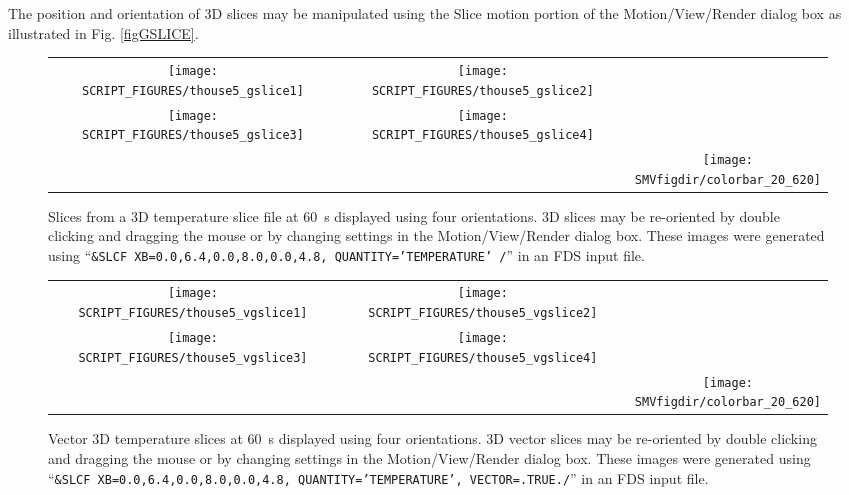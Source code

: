 \documentclass[11pt,twoside]{book}
\newcommand{\figheightAbar}{2.2in}
\begin{document}
The position and orientation of 3D slices may be manipulated using the Slice motion
portion of the Motion/View/Render dialog box as illustrated
in Fig. \ref{figGSLICE}.

\begin{figure}[bph]
\begin{center}
\begin{tabular}{ccc}
\texttt{[image: SCRIPT\_FIGURES/thouse5\_gslice1]}&
\texttt{[image: SCRIPT\_FIGURES/thouse5\_gslice2]}\\
\texttt{[image: SCRIPT\_FIGURES/thouse5\_gslice3]}&
\texttt{[image: SCRIPT\_FIGURES/thouse5\_gslice4]}&\\
&&\raisebox{0.0ex}[0pt]{\texttt{[image: \\SMVfigdir/colorbar\_20\_620]}}\\
\end{tabular}
\caption [General oriented temperature slices.]
{
Slices from a 3D temperature slice file at 60~s displayed using four orientations.
3D slices may be re-oriented by double clicking and dragging the mouse
or by changing settings in the Motion/View/Render dialog box.
These images were generated using
``{\tt \&SLCF XB=0.0,6.4,0.0,8.0,0.0,4.8, QUANTITY='TEMPERATURE' /}'' in an FDS
input file. }
\label{figgslice}%
\end{center}
\end{figure}

\begin{figure}[bph]
\begin{center}
\begin{tabular}{ccc}
\texttt{[image: SCRIPT\_FIGURES/thouse5\_vgslice1]}&
\texttt{[image: SCRIPT\_FIGURES/thouse5\_vgslice2]}\\
\texttt{[image: SCRIPT\_FIGURES/thouse5\_vgslice3]}&
\texttt{[image: SCRIPT\_FIGURES/thouse5\_vgslice4]}&\\
&&\raisebox{0.0ex}[0pt]{\texttt{[image: \\SMVfigdir/colorbar\_20\_620]}}\\
\end{tabular}
\caption [General oriented vector temperature slices.]
{
Vector 3D temperature slices at 60~s displayed using four orientations.
3D vector slices may be re-oriented by double clicking and dragging the mouse
or by changing settings in the Motion/View/Render dialog box.
These images were generated using
``{\tt \&SLCF XB=0.0,6.4,0.0,8.0,0.0,4.8, QUANTITY='TEMPERATURE', VECTOR=.TRUE./}'' in an FDS
input file. }
\label{figvgslice}%
\end{center}
\end{figure}
\end{document}
